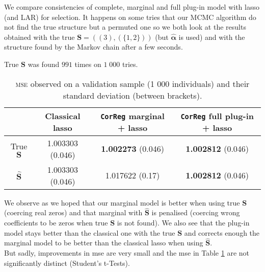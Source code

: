 \documentclass[12pt,a4paper]{report}
\begin{document}
		
		We compare consistencies of complete, marginal and full plug-in model with {\sc lasso} (and LAR) for selection.
		It happens on some tries that our MCMC algorithm do not find the true structure but a permuted one so we both look at the results obtained with the true $\boldsymbol{S}=((3),(\{1,2\}))$ (but $\hat{\boldsymbol{\alpha}}$ is used) and with the structure found by the Markov chain after a few seconds.
		
		True $\boldsymbol{S}$ was found $991$ times on $1\;000$ tries.%
		
		\begin{table}[h!]
		\centering
		\begin{tabular}{|c|c|c|c|}
		\hline 
		 & Classical {\sc lasso} & {\tt CorReg} marginal + {\sc lasso}& {\tt CorReg} full plug-in + {\sc lasso}\\ 
		\hline 
		True $\boldsymbol{S}$ &  1.003303 (0.046) & \textbf{1.002273} (0.046)& \textbf{1.002812} (0.046)\\ 
		\hline 
		$\hat{\boldsymbol{S}}$ & 1.003303 (0.046)& 1.017622 (0.17)& \textbf{1.002812} (0.046)\\ 
		\hline 
		\end{tabular} 
		\caption{\textsc{mse} observed on a validation sample (1 000 individuals) and their standard deviation (between brackets).}\label{MSEconsistlasso}
		\end{table}

		We observe as we hoped that our marginal model is better when using true $\boldsymbol{S}$ (coercing real zeros) and that marginal with $\hat{\boldsymbol{S}}$ is penalised (coercing wrong coefficients to be zeros when true $\boldsymbol{S}$ is not found).
		We also see that the plug-in model stays better than the classical one with the true $\boldsymbol{S}$ and corrects enough the marginal model to be better than the classical {\sc lasso} when using $\hat{\boldsymbol{S}}$. \\
		
		But sadly, improvements in {\sc mse} are very small and the {\sc mse} in Table \ref{MSEconsistlasso} are not significantly distinct (Student's t-Tests).\\
\end{document}
